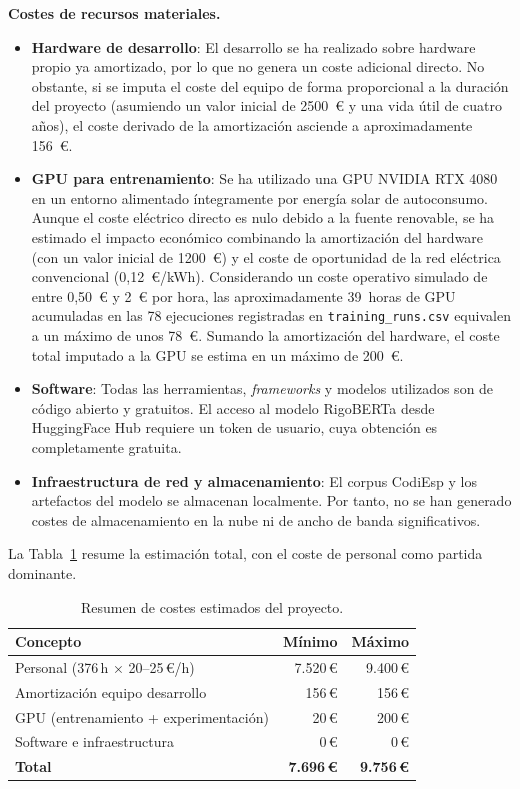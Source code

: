 \textbf{Costes de recursos materiales.}
\begin{itemize}
 \item \textbf{Hardware de desarrollo}: El desarrollo se ha realizado sobre hardware propio ya amortizado, por lo que no genera un coste adicional directo. No obstante, si se imputa el coste del equipo de forma proporcional a la duración del proyecto (asumiendo un valor inicial de 2500~€ y una vida útil de cuatro años), el coste derivado de la amortización asciende a aproximadamente 156~€.
 \item \textbf{GPU para entrenamiento}: Se ha utilizado una GPU NVIDIA RTX 4080 en un entorno alimentado íntegramente por energía solar de autoconsumo. Aunque el coste eléctrico directo es nulo debido a la fuente renovable, se ha estimado el impacto económico combinando la amortización del hardware (con un valor inicial de 1200~€) y el coste de oportunidad de la red eléctrica convencional (0,12~€/kWh). Considerando un coste operativo simulado de entre 0,50~€ y 2~€ por hora, las aproximadamente 39~horas de GPU acumuladas en las 78 ejecuciones registradas en \texttt{training\_runs.csv} equivalen a un máximo de unos 78~€. Sumando la amortización del hardware, el coste total imputado a la GPU se estima en un máximo de 200~€.
 \item \textbf{Software}: Todas las herramientas, \emph{frameworks} y modelos utilizados son de código abierto y gratuitos. El acceso al modelo RigoBERTa desde HuggingFace Hub requiere un token de usuario, cuya obtención es completamente gratuita.
 \item \textbf{Infraestructura de red y almacenamiento}: El corpus CodiEsp y los artefactos del modelo se almacenan localmente. Por tanto, no se han generado costes de almacenamiento en la nube ni de ancho de banda significativos.
\end{itemize}

La Tabla~\ref{tab:costes} resume la estimación total, con el coste de personal como partida dominante.

\begin{table}[h]
\centering
\begin{tabular}{lrr}
\hline
\textbf{Concepto} & \textbf{Mínimo} & \textbf{Máximo} \\
\hline
Personal (376\,h × 20--25\,€/h) & 7.520\,€ & 9.400\,€ \\
Amortización equipo desarrollo & 156\,€ & 156\,€ \\
GPU (entrenamiento + experimentación) & 20\,€ & 200\,€ \\
Software e infraestructura & 0\,€ & 0\,€ \\
\hline
\textbf{Total} & \textbf{7.696\,€} & \textbf{9.756\,€} \\
\hline
\end{tabular}
\caption{Resumen de costes estimados del proyecto.}
\label{tab:costes}
\end{table}

